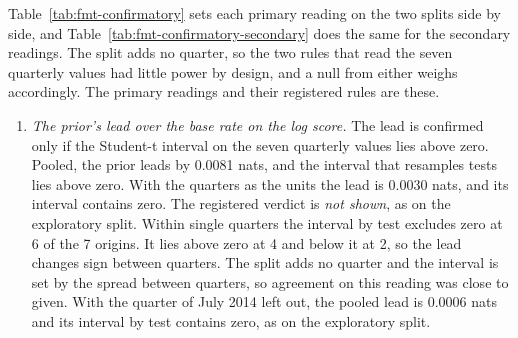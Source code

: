 Table~\ref{tab:fmt-confirmatory} sets each primary reading on the two splits side by side, and Table~\ref{tab:fmt-confirmatory-secondary} does the same for the secondary readings. The split adds no quarter, so the two rules that read the seven quarterly values had little power by design, and a null from either weighs accordingly. The primary readings and their registered rules are these.
\begin{enumerate}
\item \emph{The prior's lead over the base rate on the log score.} The lead is confirmed only if the Student-t interval on the seven quarterly values lies above zero. Pooled, the prior leads by 0.0081 nats, and the interval that resamples tests lies above zero. With the quarters as the units the lead is 0.0030 nats, and its interval contains zero. The registered verdict is \emph{not shown}, as on the exploratory split. Within single quarters the interval by test excludes zero at 6 of the 7 origins. It lies above zero at 4 and below it at 2, so the lead changes sign between quarters. The split adds no quarter and the interval is set by the spread between quarters, so agreement on this reading was close to given. With the quarter of July 2014 left out, the pooled lead is 0.0006 nats and its interval by test contains zero, as on the exploratory split.

\end{enumerate}
